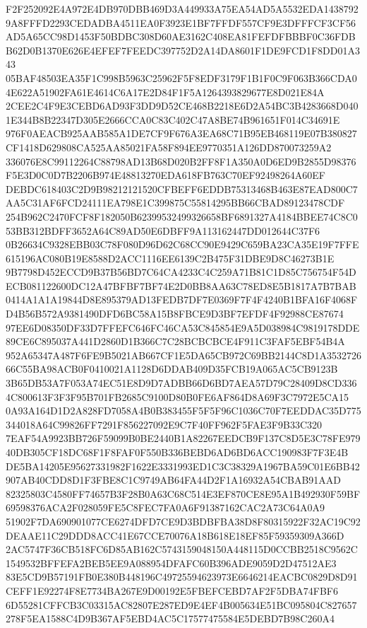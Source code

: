 \documentclass[UTF8,fontset=fandol,zihao=-4,a4paper]{ctexart}
\begin{document}
{{F2F252092E4A972E4DB970DBB469D3A449933A75EA54AD5A5532EDA14387929A8FFFD2293CEDADBA4511EA0F3923E1BF7FFDF557CF9E3DFFFCF3CF56
AD5A65CC98D1453F50BDBC308D60AE3162C408EA81FEFDFBBBF0C36FDBB62D0B1370E626E4EFEF7FEEDC397752D2A14DA8601F1DE9FCD1F8DD01A343
05BAF48503EA35F1C998B5963C25962F5F8EDF3179F1B1F0C9F063B366CDA04E622A51902FA61E4614C6A17E2D84F1F5A1264393829677E8D021E84A
2CEE2C4F9E3CEBD6AD93F3DD9D52CE468B2218E6D2A54BC3B4283668D0401E344B8B22347D305E2666CCA0C83C402C47A8BE74B961651F014C34691E
976F0AEACB925AAB585A1DE7CF9F676A3EA68C71B95EB468119E07B380827CF1418D629808CA525AA85021FA58F894EE9770351A126DD870073259A2
336076E8C99112264C88798AD13B68D020B2FF8F1A350A0D6ED9B2855D98376F5E3D0C0D7B2206B974E48813270EDA618FB763C70EF92498264A60EF
DEBDC618403C2D9B98212121520CFBEFF6EDDB75313468B463E87EAD800C7AA5C31AF6FCD24111EA798E1C399875C55814295BB66CBAD89123478CDF
254B962C2470FCF8F182050B62399532499326658BF6891327A4184BBEE74C8C053BB312BDFF3652A64C89AD50E6DBFF9A113162447DD012644C37F6
0B26634C9328EBB03C78F080D96D62C68CC90E9429C659BA23CA35E19F7FFE615196AC080B19E8588D2ACC1116EE6139C2B475F31DBE9D8C46273B1E
9B7798D452ECCD9B37B56BD7C64CA4233C4C259A71B81C1D85C756754F54DECB081122600DC12A47BFBF7BF74E2D0BB8AA63C78ED8E5B1817A7B7BAB
0414A1A1A19844D8E895379AD13FEDB7DF7E0369F7F4F4240B1BFA16F4068FD4B56B572A9381490DFD6BC58A15B8FBCE9D3BF7EFDF4F92988CE87674
97EE6D08350DF33D7FFEFC646FC46CA53C845854E9A5D038984C9819178DDE89CE6C895037A441D2860D1B366C7C28BCBCBCE4F911C3FAF5EBF54B4A
952A65347A487F6FE9B5021AB667CF1E5DA65CB972C69BB2144C8D1A353272666C55BA98ACB0F0410021A1128D6DDAB409D35FCB19A065AC5CB9123B
3B65DB53A7F053A74EC51E8D9D7ADBB66D6BD7AEA57D79C28409D8CD3364C800613F3F3F95B701FB2685C9100D80B0FE6AF864D8A69F3C7972E5CA15
0A93A164D1D2A828FD7058A4B0B383455F5F5F96C1036C70F7EEDDAC35D775344018A64C99826FF7291F856227092E9C7F40FF962F5FAE3F9B33C320
7EAF54A9923BB726F59099B0BE2440B1A82267EEDCB9F137C8D5E3C78FE97940DB305CF18DC68F1F8FAF0F550B336BEBD6AD6BD6ACC190983F7F3E4B
DE5BA14205E95627331982F1622E3331993ED1C3C38329A1967BA59C01E6BB42907AB40CDD8D1F3FBE8C1C9749AB64FA44D2F1A16932A54CBAB91AAD
82325803C4580FF74657B3F28B0A63C68C514E3EF870CE8E95A1B492930F59BF69598376ACA2F028059FE5C8FEC7FA0A6F91387162CAC2A73C64A0A9
51902F7DA690901077CE6274DFD7CE9D3BDBFBA38D8F80315922F32AC19C92DEAAE11C29DDD8ACC41E67CCE70076A18B618E18EF85F59359309A366D
2AC5747F36CB518FC6D85AB162C5743159048150A448115D0CCBB2518C9562C1549532BFFEFA2BEB5EE9A088954DFAFC60B396ADE9059D2D47512AE3
83E5CD9B57191FB0E380B448196C49725594623973E6646214EACBC0829D8D91CEFF1E92274F8E7734BA267E9D00192E5FBEFCEBD7AF2F5DBA74FBF6
6D55281CFFCB3C03315AC82807E287ED9E4EF4B005634E51BC095804C827657278F5EA1588C4D9B367AF5EBD4AC5C17577475584E5DEBD7B98C260A4
}}
\end{document}
